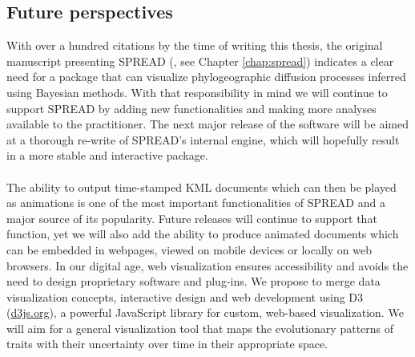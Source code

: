 \subsection{Future perspectives}

With over a hundred citations by the time of writing this thesis, the original manuscript presenting SPREAD (\citet{Bielejec2011}, see Chapter \ref{chap:spread}) indicates a clear need for a package that can visualize phylogeographic diffusion processes inferred using Bayesian methods.
With that responsibility in mind we will continue to support SPREAD by adding new functionalities and making more analyses available to the practitioner.
The next major release of the software will be aimed at a thorough re-write of SPREAD's internal engine, which will hopefully result in a more stable and interactive package.

\paragraph{}
The ability to output time-stamped KML documents which can then be played as animations is one of the most important functionalities of SPREAD and a major source of its popularity.
Future releases will continue to support that function, yet we will also add the ability to produce animated documents which can be embedded in webpages, viewed on mobile devices or locally on web browsers.
In our digital age, web visualization ensures accessibility and avoids the need to design proprietary software and plug-ins. We propose to merge data visualization concepts, interactive design and web development using D3 (\url{d3js.org}), a powerful JavaScript library for custom, web-based visualization. 
We will aim for a general visualization tool that maps the evolutionary patterns of traits with their uncertainty over time in their appropriate space. 


